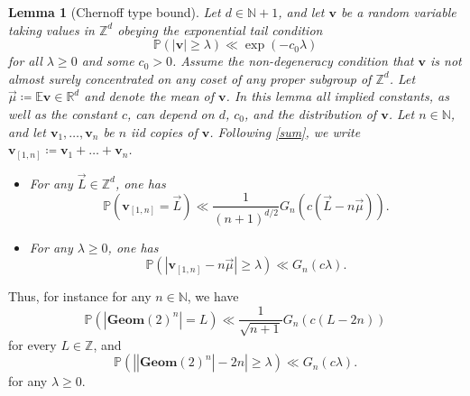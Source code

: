 \documentclass[12pt,a4paper,reqno]{amsart}
\numberwithin{equation}{section}
\theoremstyle{plain}
\newtheorem{lemma}[theorem]{Lemma}
\theoremstyle{definition}
\renewcommand\P{\mathbb{P}}
\newcommand\E{\mathbb{E}}
\newcommand\R{\mathbb{R}}
\newcommand\Z{\mathbb{Z}}
\newcommand\N{\mathbb{N}}
\renewcommand\v{\mathbf{v}}
\newcommand\Geom{\mathbf{Geom}}
\begin{document}
\begin{lemma}[Chernoff type bound]\label{chern}  Let $d \in \N+1$, and let $\v$ be a random variable taking values in $\Z^d$ obeying the exponential tail condition
\begin{equation}\label{pvl}
 \P( |\v| \geq \lambda ) \ll \exp( -c_0 \lambda )
\end{equation}
for all $\lambda \geq 0$ and some $c_0>0$.  Assume the non-degeneracy condition that $\v$ is not almost surely concentrated on any coset of any proper subgroup of $\Z^d$.  Let $\vec \mu \coloneqq \E \v \in \R^d$ and  denote the mean of $\v$.   In this lemma all implied constants, as well as the constant $c$, can depend on $d$, $c_0$, and the distribution of $\v$.  Let $n \in \N$, and let $\v_1,\dots,\v_n$ be $n$ iid copies of $\v$.  Following \eqref{sum}, we write $\v_{[1,n]} \coloneqq \v_1 + \dots + \v_n$.
\begin{itemize}
\item[(i)]  For any $\vec L \in \Z^d$, one has
$$ \P( \v_{[1,n]} = \vec L ) \ll \frac{1}{(n+1)^{d/2}}G_n( c (\vec L - n \vec \mu) ).$$
\item[(ii)]  For any $\lambda \geq 0$, one has
$$ \P( |\v_{[1,n]}- n \vec \mu| \geq \lambda ) \ll G_n( c \lambda ).$$
\end{itemize}
\end{lemma}

Thus, for instance for any $n \in \N$, we have
$$ \P( |\Geom(2)^n| = L ) \ll \frac{1}{\sqrt{n+1}} G_n( c(L-2n))$$
for every $L \in \Z$, and
$$ \P\left( \left||\Geom(2)^n| - 2n\right| \geq \lambda \right) \ll G_n(c \lambda).$$
for any $\lambda \geq 0$. 
\end{document}

